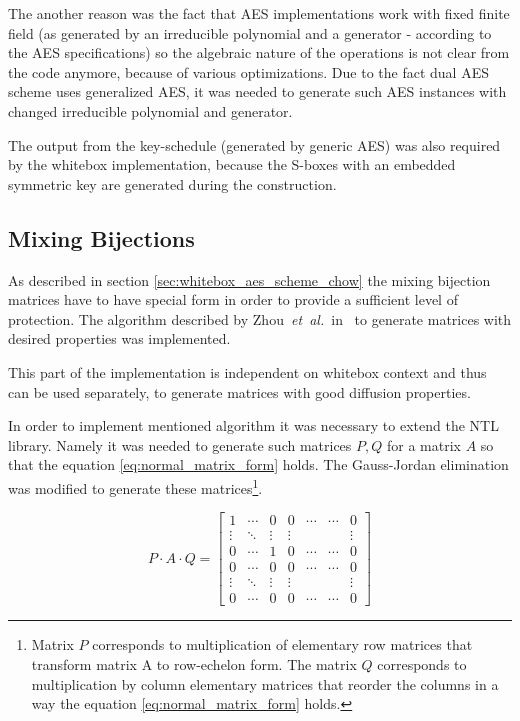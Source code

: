 \documentclass[11pt,oneside,final]{fithesis2}
\newcommand{\eal}{\emph{et~al.}}
\begin{document}
    The another reason was the fact that AES implementations work with fixed finite field (as generated by an irreducible polynomial and a generator - according 
    to the AES specifications) so the algebraic nature of the operations is not clear from the code anymore, because of various optimizations. Due to the fact
    dual AES scheme uses generalized AES, it was needed to generate such AES instances with changed irreducible polynomial and generator. 
    
    The output from the key-schedule (generated by generic AES) was also required by the whitebox implementation, because the S-boxes with an embedded symmetric key
    are generated during the construction.
    
    \subsection{Mixing Bijections}\label{sec:mixingBijectionsImpl}
    As described in section \ref{sec:whitebox_aes_scheme_chow} the mixing bijection matrices have to have special form in order to provide a sufficient 
    level of protection. The algorithm described by Zhou~\eal\ in~\citep{journals/iacr/XiaoZ02} to generate matrices with desired properties was implemented.
    
    This part of the implementation is independent on whitebox context and thus can be used separately, to generate matrices with good diffusion properties.
    
    In order to implement mentioned algorithm it was necessary to extend the NTL library. Namely it was needed to generate such matrices $P, Q$ for a matrix $A$
    so that the equation \ref{eq:normal_matrix_form} holds. The Gauss-Jordan elimination was modified to generate these matrices\footnote{Matrix $P$ corresponds to multiplication of 
    elementary row matrices that transform matrix A to row-echelon form. The matrix $Q$ corresponds to multiplication by column elementary matrices that
    reorder the columns in a way the equation \ref{eq:normal_matrix_form} holds.}.

    \begin{equation}\label{eq:normal_matrix_form}
	P \cdot A \cdot Q = 
	\begin{bmatrix}
	    1      & \cdots & 0      & 0      & \cdots & \cdots & 0      \\
	    \vdots & \ddots & \vdots & \vdots &        &        & \vdots \\ 
	    0      & \cdots & 1      & 0      & \cdots & \cdots & 0      \\
	    0      & \cdots & 0      & 0      & \cdots & \cdots & 0      \\
	    \vdots & \ddots & \vdots & \vdots &        &        & \vdots \\ 
	    0      & \cdots & 0      & 0      & \cdots & \cdots & 0      
	\end{bmatrix}
    \end{equation}
    
\end{document}
